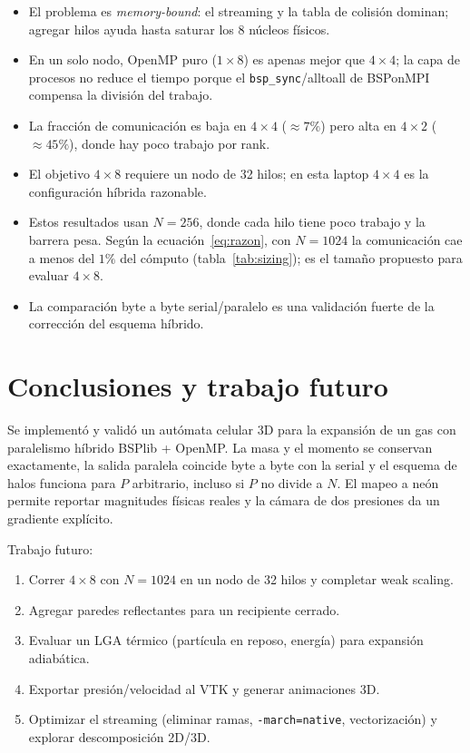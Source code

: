 \documentclass[11pt,a4paper]{article}
\begin{document}
\begin{itemize}[leftmargin=*]
  \item El problema es \emph{memory-bound}: el streaming y la tabla de colisión
        dominan; agregar hilos ayuda hasta saturar los 8 núcleos físicos.
  \item En un solo nodo, OpenMP puro ($1\times8$) es apenas mejor que
        $4\times4$; la capa de procesos no reduce el tiempo porque el
        \texttt{bsp\_sync}/alltoall de BSPonMPI compensa la división del
        trabajo.
  \item La fracción de comunicación es baja en $4\times4$ ($\approx7\%$) pero
        alta en $4\times2$ ($\approx45\%$), donde hay poco trabajo por rank.
  \item El objetivo $4\times8$ requiere un nodo de 32 hilos; en esta laptop
        $4\times4$ es la configuración híbrida razonable.
  \item Estos resultados usan $N=256$, donde cada hilo tiene poco trabajo y la
        barrera pesa. Según la ecuación~\eqref{eq:razon}, con $N=1024$ la
        comunicación cae a menos del $1\%$ del cómputo
        (tabla~\ref{tab:sizing}); es el tamaño propuesto para evaluar
        $4\times8$.
  \item La comparación byte a byte serial/paralelo es una validación fuerte de
        la corrección del esquema híbrido.
\end{itemize}

\section{Conclusiones y trabajo futuro}

Se implementó y validó un autómata celular 3D para la expansión de un gas con
paralelismo híbrido BSPlib + OpenMP. La masa y el momento se conservan
exactamente, la salida paralela coincide byte a byte con la serial y el esquema
de halos funciona para $P$ arbitrario, incluso si $P$ no divide a $N$. El mapeo
a neón permite reportar magnitudes físicas reales y la cámara de dos presiones
da un gradiente explícito.

Trabajo futuro:
\begin{enumerate}[leftmargin=*]
  \item Correr $4\times8$ con $N=1024$ en un nodo de 32 hilos y completar
        weak scaling.
  \item Agregar paredes reflectantes para un recipiente cerrado.
  \item Evaluar un LGA térmico (partícula en reposo, energía) para expansión
        adiabática.
  \item Exportar presión/velocidad al VTK y generar animaciones 3D.
  \item Optimizar el streaming (eliminar ramas, \texttt{-march=native},
        vectorización) y explorar descomposición 2D/3D.
\end{enumerate}
\end{document}
